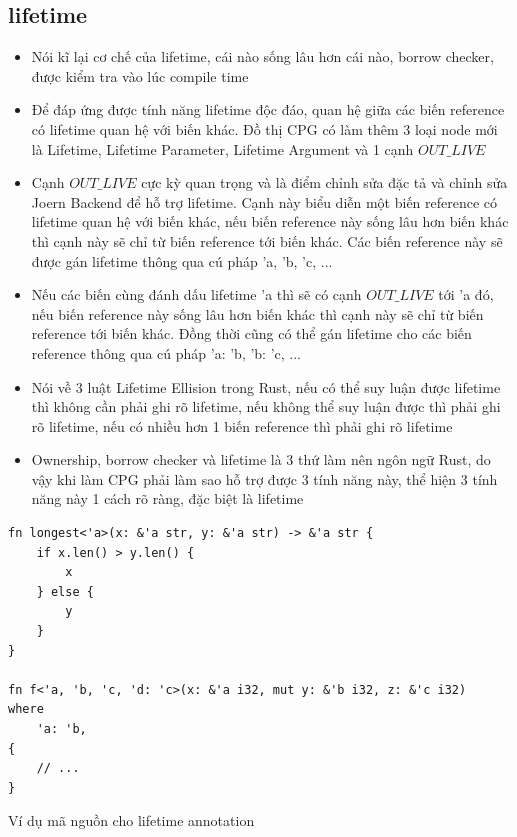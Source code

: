 \subsection{lifetime}

\begin{itemize}
    \item Nói kĩ lại cơ chế của lifetime, cái nào sống lâu hơn cái nào, borrow checker, được kiểm tra vào lúc compile time
    \item Để đáp ứng được tính năng lifetime độc đáo, quan hệ giữa các biến reference có lifetime quan hệ với biến khác. Đồ thị CPG có làm thêm 3 loại node mới là Lifetime, Lifetime Parameter, Lifetime Argument và 1 cạnh $OUT\_LIVE$
    \item Cạnh $OUT\_LIVE$ cực kỳ quan trọng và là điểm chỉnh sửa đặc tả và chỉnh sửa Joern Backend để hỗ trợ lifetime. Cạnh này biểu diễn một biến reference có lifetime quan hệ với biến khác, nếu biến reference này sống lâu hơn biến khác thì cạnh này sẽ chỉ từ biến reference tới biến khác. Các biến reference này sẽ được gán lifetime thông qua cú pháp 'a, 'b, 'c, ...
    \item Nếu các biến cùng đánh dấu lifetime 'a thì sẽ có cạnh $OUT\_LIVE$ tới 'a đó, nếu biến reference này sống lâu hơn biến khác thì cạnh này sẽ chỉ từ biến reference tới biến khác. Đồng thời cũng có thể gán lifetime cho các biến reference thông qua cú pháp 'a: 'b, 'b: 'c, ...
    \item Nói về 3 luật Lifetime Ellision trong Rust, nếu có thể suy luận được lifetime thì không cần phải ghi rõ lifetime, nếu không thể suy luận được thì phải ghi rõ lifetime, nếu có nhiều hơn 1 biến reference thì phải ghi rõ lifetime
    \item Ownership, borrow checker và lifetime là 3 thứ làm nên ngôn ngữ Rust, do vậy khi làm CPG phải làm sao hỗ trợ được 3 tính năng này, thể hiện 3 tính năng này 1 cách rõ ràng, đặc biệt là lifetime
\end{itemize}

\begin{listing}[H]
\begin{verbatim}
fn longest<'a>(x: &'a str, y: &'a str) -> &'a str {
    if x.len() > y.len() {
        x
    } else {
        y
    }
}

fn f<'a, 'b, 'c, 'd: 'c>(x: &'a i32, mut y: &'b i32, z: &'c i32)
where
    'a: 'b,
{
    // ...
}

\end{verbatim}
\caption{Ví dụ mã nguồn cho lifetime annotation}
\label{code:c3_lifetime}
\end{listing}

